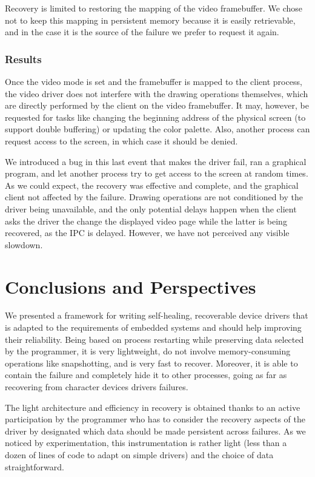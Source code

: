 \documentclass[times, 10pt, twocolumn]{article}
\begin{document}
Recovery is limited to restoring the mapping of the video framebuffer. We chose not to keep this mapping in persistent memory because it is easily retrievable, and in the case it is the source of the failure we prefer to request it again.

\subsubsection{Results}
Once the video mode is set and the framebuffer is mapped to the client process, the video driver does not interfere with the drawing operations themselves, which are directly performed by the client on the video framebuffer. It may, however, be requested for tasks like changing the beginning address of the physical screen (to support double buffering) or updating the color palette. Also, another process can request access to the screen, in which case it should be denied.

We introduced a bug in this last event that makes the driver fail, ran a graphical program, and let another process try to get access to the screen at random times. As we could expect, the recovery was effective and complete, and the graphical client not affected by the failure. Drawing operations are not conditioned by the driver being unavailable, and the only potential delays happen when the client asks the driver the change the displayed video page while the latter is being recovered, as the IPC is delayed. However, we have not perceived any visible slowdown.


\section{Conclusions and Perspectives}
\label{s:sum}

We presented a framework for writing self-healing, recoverable device drivers that is adapted to the requirements of embedded systems and should help improving their reliability. Being based on process restarting while preserving data selected by the programmer, it is very lightweight, do not involve memory-consuming operations like snapshotting, and is very fast to recover. Moreover, it is able to contain the failure and completely hide it to other processes, going as far as recovering from character devices drivers failures.

The light architecture and efficiency in recovery is obtained thanks to an active participation by the programmer who has to consider the recovery aspects of the driver by designated which data should be made persistent across failures. As we noticed by experimentation, this instrumentation is rather light (less than a dozen of lines of code to adapt on simple drivers) and the choice of data straightforward.
\end{document}
